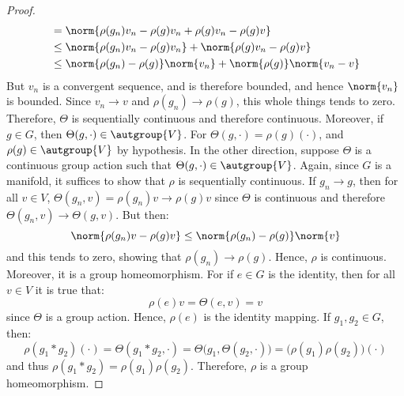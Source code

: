 \begin{proof}
\begin{subequations}
\begin{align}
                    &=\norm{\rho(g_{n})v_{n}-\rho(g)v_{n}
                        +\rho(g)v_{n}-\rho(g)v}\\
                    &\leq\norm{\rho(g_{n})v_{n}-\rho(g)v_{n}}+
                        \norm{\rho(g)v_{n}-\rho(g)v}\\
                    &\leq\norm{\rho(g_{n})-\rho(g)}\norm{v_{n}}
                        +\norm{\rho(g)}\norm{v_{n}-v}
                \end{align}
            \end{subequations}
            But $v_{n}$ is a convergent sequence, and is therefore bounded, and
            hence $\norm{v_{n}}$ is bounded. Since $v_{n}\rightarrow{v}$ and
            $\rho(g_{n})\rightarrow\rho(g)$, this whole things tends to zero.
            Therefore, $\Theta$ is sequentially continuous and therefore
            continuous. Moreover, if $g\in{G}$, then
            $\Theta(g,\cdot)\in\autgroup{V}$. For
            $\Theta(g,\cdot)=\rho(g)(\cdot)$, and $\rho(g)\in\autgroup{V}$ by
            hypothesis. In the other direction, suppose $\Theta$ is a continuous
            group action such that $\Theta(g,\cdot)\in\autgroup{V}$. Again,
            since $G$ is a manifold, it suffices to show that $\rho$ is
            sequentially continuous. If $g_{n}\rightarrow{g}$, then for all
            $v\in{V}$, $\Theta(g_{n},v)=\rho(g_{n})v\rightarrow\rho(g)v$ since
            $\Theta$ is continuous and therefore
            $\Theta(g_{n},v)\rightarrow\Theta(g,v)$. But then:
            \begin{equation}
                \norm{\rho(g_{n})v-\rho(g)v}
                \leq\norm{\rho(g_{n})-\rho(g)}\norm{v}
            \end{equation}
            and this tends to zero, showing that
            $\rho(g_{n})\rightarrow\rho(g)$. Hence, $\rho$ is continuous.
            Moreover, it is a group homeomorphism. For if $e\in{G}$ is the
            identity, then for all $v\in{V}$ it is true that:
            \begin{equation}
                \rho(e)v=\Theta(e,v)=v
            \end{equation}
            since $\Theta$ is a group action. Hence, $\rho(e)$ is the identity
            mapping. If $g_{1},g_{2}\in{G}$, then:
            \begin{equation}
                \rho(g_{1}*g_{2})(\cdot)=\Theta(g_{1}*g_{2},\cdot)
                    =\Theta\big(g_{1},\Theta(g_{2},\cdot)\big)
                    =\big(\rho(g_{1})\rho(g_{2})\big)(\cdot)
            \end{equation}
            and thus $\rho(g_{1}*g_{2})=\rho(g_{1})\rho(g_{2})$. Therefore,
            $\rho$ is a group homeomorphism.
        \end{proof}
